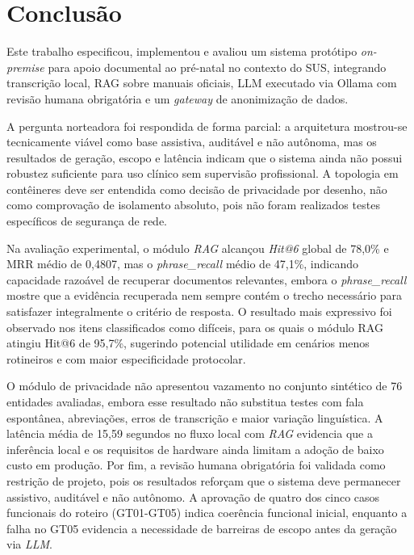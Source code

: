 \documentclass[12pt]{article}
\begin{document}
\section{Conclusão}

Este trabalho especificou, implementou e avaliou um sistema protótipo \textit{on-premise} para apoio documental ao pré-natal no contexto do SUS, integrando transcrição local, RAG sobre manuais oficiais, LLM executado via Ollama com revisão humana obrigatória e um \textit{gateway} de anonimização de dados.

A pergunta norteadora foi respondida de forma parcial:
a arquitetura mostrou-se tecnicamente viável como base assistiva, auditável e não autônoma, mas os resultados de geração, escopo e latência indicam que o sistema ainda não possui robustez suficiente para uso clínico sem supervisão profissional.
A topologia em contêineres deve ser entendida como decisão de privacidade por desenho, não como comprovação de isolamento absoluto, pois não foram realizados testes específicos de segurança de rede.

Na avaliação experimental, o módulo \textit{RAG} alcançou \textit{Hit@6} global de 78,0\% e MRR médio de 0,4807, mas o \textit{phrase\_recall} médio de 47,1\%, indicando capacidade razoável de recuperar documentos relevantes, embora o \textit{phrase\_recall} mostre que a evidência recuperada nem sempre contém o trecho necessário para satisfazer integralmente o critério de resposta.
O resultado mais expressivo foi observado nos itens classificados como difíceis, para os quais o módulo RAG atingiu Hit@6 de 95,7\%, sugerindo potencial utilidade em cenários menos rotineiros e com maior especificidade protocolar.

O módulo de privacidade não apresentou vazamento no conjunto sintético de 76 entidades avaliadas, embora esse resultado não substitua testes com fala espontânea, abreviações, erros de transcrição e maior variação linguística.
A latência média de 15,59 segundos no fluxo local com \textit{RAG} evidencia que a inferência local e os requisitos de hardware ainda limitam a adoção de baixo custo em produção.
Por fim, a revisão humana obrigatória foi validada como restrição de projeto, pois os resultados reforçam que o sistema deve permanecer assistivo, auditável e não autônomo.
A aprovação de quatro dos cinco casos funcionais do roteiro (GT01-GT05) indica coerência funcional inicial, enquanto a falha no GT05 evidencia a necessidade de barreiras de escopo antes da geração via \textit{LLM}.
\end{document}
